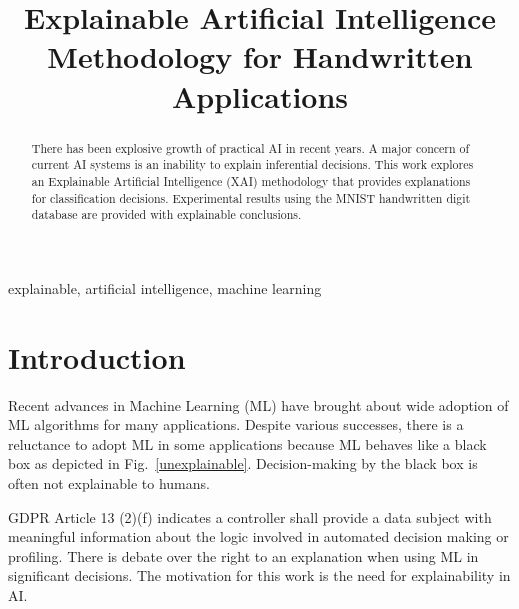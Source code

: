 \documentclass[conference]{IEEEtran}
\begin{document}
\title{Explainable Artificial Intelligence \\ {Methodology for Handwritten Applications}}

\author{

}

\maketitle

\begin{abstract}
There has been explosive growth of practical AI in recent years.
A major concern of current AI systems is an inability to explain inferential decisions.
This work explores an Explainable Artificial Intelligence (XAI) methodology that provides explanations
for classification decisions.  Experimental results using the MNIST handwritten digit database are provided with explainable conclusions.
\end{abstract}

\begin{IEEEkeywords}
explainable, artificial intelligence, machine learning
\end{IEEEkeywords}

\section{Introduction}

Recent advances in Machine Learning (ML) have brought about wide adoption of ML algorithms for many applications.  Despite various successes, there is a reluctance to adopt ML in some applications because ML behaves like a black box as depicted in Fig.~\ref{unexplainable}.  Decision-making by the black box is often not explainable to humans. 

GDPR \cite{gdpr2016} Article 13 (2)(f) indicates a controller shall provide a data subject with meaningful information about the logic involved in automated decision making or profiling.  There is debate over the right to an explanation when using ML in significant decisions\cite{selbst}.  The motivation for this work is the need for explainability in AI.
\end{document}
